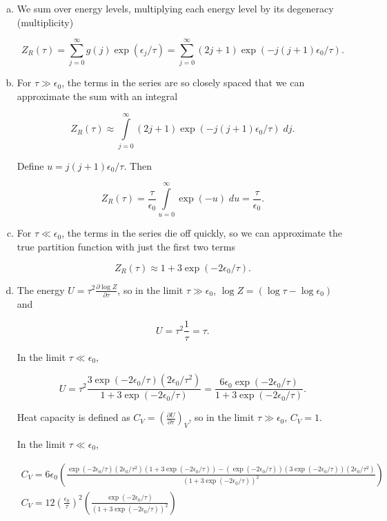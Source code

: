 \documentclass{article}
\begin{document}
\begin{enumerate}
\begin{enumerate}[(a)]
		\item 

		We sum over energy levels, multiplying each energy level by its degeneracy (multiplicity)

		$$Z_R(\tau) = \sum \limits_{j=0}^{\infty} g(j) \exp(\epsilon_j / \tau) = \sum \limits_{j=0}^{\infty} (2j+1) \exp(-j(j+1) \epsilon_0 / \tau).$$

		\item

		For $\tau \gg \epsilon_0$, the terms in the series are so closely spaced that we can approximate the sum with an integral

		$$Z_R(\tau) \approx \int \limits_{j=0}^{\infty} (2j+1) \exp(-j(j+1) \epsilon_0 / \tau) \; dj.$$

		Define $u = j(j+1) \epsilon_0 / \tau$. Then 

		$$Z_R(\tau) = \frac{\tau}{\epsilon_0} \int \limits_{u=0}^{\infty} \exp(-u) \; du = \frac{\tau}{\epsilon_0}.$$

		\item

		For $\tau \ll \epsilon_0$, the terms in the series die off quickly, so we can approximate the true partition function with just the first two terms

		$$Z_R(\tau) \approx 1 + 3\exp(-2 \epsilon_0 / \tau).$$

		\item

		The energy $U = \tau^2 \frac{ \partial \log Z}{\partial \tau}$, so in the limit $\tau \gg \epsilon_0$, $\log Z = (\log \tau - \log \epsilon_0)$ and 

		$$U = \tau^2 \frac{1}{\tau} = \tau.$$

		In the limit $\tau \ll \epsilon_0$,

		$$U = \tau^2 \frac{3\exp(-2\epsilon_0/\tau) (2\epsilon_0 / \tau^2)}{1 + 3\exp(-2\epsilon_0 / \tau)} = \frac{6 \epsilon_0 \exp(-2\epsilon_0 / \tau)}{1 + 3\exp(-2\epsilon_0/\tau)}.$$

		Heat capacity is defined as $C_V = \left(\frac{\partial U}{\partial \tau}\right)_V$, so in the limit $\tau \gg \epsilon_0$, $C_V = 1.$

		In the limit $\tau \ll \epsilon_0$, 

		\begin{gather*}
		C_V = 6\epsilon_0 \left( \frac{\exp(-2\epsilon_0/\tau)(2 \epsilon_0 / \tau^2) (1 + 3\exp(-2\epsilon_0/\tau)) - (\exp(-2\epsilon_0/\tau))(3 \exp(-2\epsilon_0/\tau))(2\epsilon_0 / \tau^2)}{(1 + 3\exp(-2\epsilon_0/\tau))^2} \right) \\
		C_V = 12 \left( \frac{\epsilon_0}{\tau} \right)^2 \left( \frac{\exp(-2\epsilon_0/\tau)} {( 1 + 3 \exp(-2\epsilon_0/\tau))^2} \right)
		\end{gather*}


\end{enumerate}
\end{enumerate}
\end{document}
